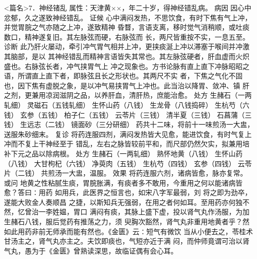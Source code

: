 \documentclass[a4paper,12pt,UTF8,twoside]{ctexbook}
\begin{document}
<篇名>7．神经锗乱
属性：天津黄××，年二十岁，得神经错乱病。 
病因 因心中忿郁，久之遂致神经错乱。 
证候 心中满闷发热，不思饮食，有时下焦有气上冲，并觉胃脘之气亦随之上冲，遂致精神 
昏瞀，言语支离，移时觉气消稍顺，或吐痰数口，精神遂复旧。其左脉弦而硬，右脉弦而 
长，两尺皆重按不实，一息五至。 
诊断 此乃肝火屡动，牵引冲气胃气相并上冲，更挟痰涎上冲以滞塞于喉间并冲激其脑部，是以 
其神经错乱而精神言语皆失其常也。其左脉弦硬者，肝血虚而火炽盛也。右脉弦长者，冲气挟胃气上 
冲之现象也。方书论脉有直上直下冲脉昭昭之语，所谓直上直下者，即脉弦且长之形状也。其两尺不实 
者，下焦之气化不固也，因下焦有虚脱之象，是以冲气易挟胃气上冲也。此当治以降胃、敛冲、镇 
肝之剂，更兼用凉润滋阴之品，以养肝血，清肝热，庶能治愈。 
处方 生赭石（一两轧细） 灵磁石（五钱轧细） 生怀山药（八钱） 生龙骨（八钱捣碎） 
生杭芍（六钱） 玄参（五钱） 柏子仁（五钱） 云苓片（三钱） 
清半夏（三钱） 石菖蒲（三钱） 生远志（二钱） 镜面砂（三分研细） 
药共十二味，将前十一味煎汤一大盅，送服朱砂细末。 
复诊 将药连服四剂，满闷发热皆大见愈，能进饮食，有时气复上冲而不复上干神经至于 
错乱，左右之脉皆较前平和，而尺部仍然欠实，拟兼用培补下元之品以除病根。 
处方 生赭石（一两轧细） 熟怀地黄（八钱） 生怀山药（八钱） 大甘枸杞（六钱） 
净萸肉（五钱） 生杭芍（四钱） 玄参（四钱） 云苓片（二钱） 
共煎汤一大盅，温服。 
效果 将药连服六剂，诸病皆愈，脉亦复常。 
或问 地黄之性粘腻生痰，胃脘胀满，有痰者多不敢用，今重用之何以能诸病皆愈？答曰∶用药 
如用兵，此医界之恒言也，如宋八字军最弱，刘 将之即为劲卒，遂能大败金人奏顺昌 
之捷，以斯知兵无强弱，在用之者何如耳。至用药亦何独不然，忆曾治一李姓媪，胃口 
满闷有痰，其脉上盛下虚，投以肾气丸作汤服，为加生赭石八钱，服后觉药有推荡之力，须 
臾胸次豁然，肾气丸非重用地黄者乎？然如此用药非前无师承而能有然也。《金匮》云∶短气有微饮 
当从小便去之，苓桂术甘汤主之，肾气丸亦主之。夫饮即痰也，气短亦近于满 
闷，而仲师竟谓可治以肾气丸，愚为于《金匮》曾熟读深思，故临证偶有会心耳。 
\end{document}
